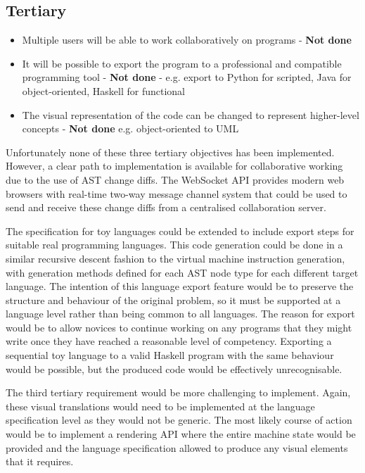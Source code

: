 \subsection{Tertiary}

\begin{itemize}
\item Multiple users will be able to work collaboratively on programs - \textbf{Not done}
\item It will be possible to export the program to a professional and compatible programming tool - \textbf{Not done}
\subitem - e.g. export to Python for scripted, Java for object-oriented, Haskell for functional
\item The visual representation of the code can be changed to represent higher-level concepts - \textbf{Not done}
\subitem e.g. object-oriented to UML
\end{itemize}

Unfortunately none of these three tertiary objectives has been implemented. However, a clear path to implementation is available for collaborative working due to the use of AST change diffs. The WebSocket API provides modern web browsers with real-time two-way message channel system that could be used to send and receive these change diffs from a centralised collaboration server.

The specification for toy languages could be extended to include export steps for suitable real programming languages. This code generation could be done in a similar recursive descent fashion to the virtual machine instruction generation, with generation methods defined for each AST node type for each different target language. The intention of this language export feature would be to preserve the structure and behaviour of the original problem, so it must be supported at a language level rather than being common to all languages. The reason for export would be to allow novices to continue working on any programs that they might write once they have reached a reasonable level of competency. Exporting a sequential toy language to a valid Haskell program with the same behaviour would be possible, but the produced code would be effectively unrecognisable.

The third tertiary requirement would be more challenging to implement. Again, these visual translations would need to be implemented at the language specification level as they would not be generic. The most likely course of action would be to implement a rendering API where the entire machine state would be provided and the language specification allowed to produce any visual elements that it requires.


